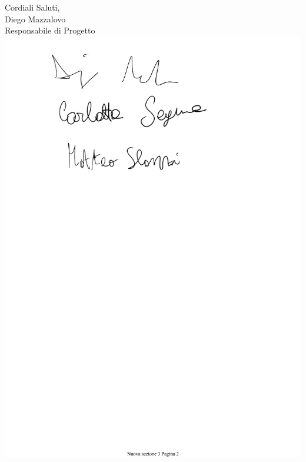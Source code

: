 \documentclass[11pt, a4paper]{letter} %
\begin{document}
\begin{letter}
		\closing{Cordiali Saluti,\\
			Diego Mazzalovo\\
			Responsabile di Progetto
			\includegraphics[scale=0.5]{images/DiegoMazzalovo.pdf}}
		
		
		
		
	\end{letter}
	
\end{document}
